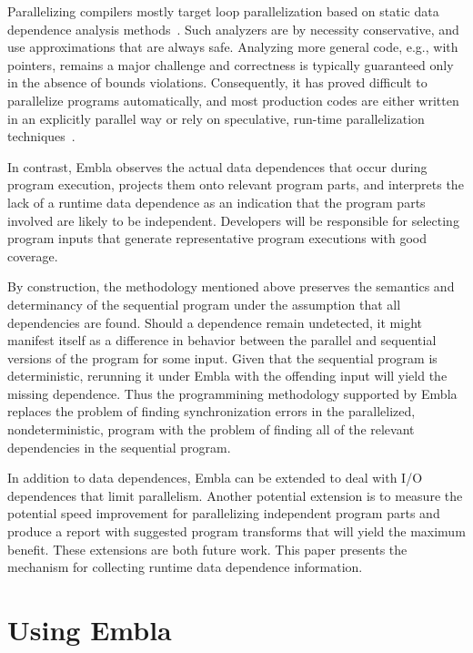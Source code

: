 \documentclass[times, 10pt,twocolumn]{article}
\begin{document}
Parallelizing compilers mostly target loop parallelization based on
static data dependence analysis methods~\cite{KA02}.  Such analyzers are
by necessity conservative, and use
approximations that are always safe.  
Analyzing more general code, e.g., with pointers, remains a major
challenge and correctness is typically guaranteed only in the absence of
bounds violations.  Consequently, it has proved difficult to
parallelize programs automatically, and most production codes are either
written in an explicitly parallel way or rely on speculative, run-time
parallelization techniques~\cite{PO03,CL03}.

In contrast, Embla
observes the actual data dependences that occur during program
execution, projects them onto relevant program parts, and interprets the
lack of a runtime data dependence as an indication that the program
parts involved are likely to be independent.
Developers will be responsible for selecting
program inputs that generate representative program executions with
good coverage.

By construction, the methodology mentioned above preserves the
semantics and determinancy of the sequential program under the
assumption that all dependencies are found.  Should a dependence
remain undetected, it might manifest itself as a difference in
behavior between the parallel and sequential versions of the program
for some input. Given that the sequential program is deterministic,
rerunning it under Embla with the offending input will yield the
missing dependence.  Thus the programmining methodology supported by
Embla replaces the problem of finding synchronization errors in the
parallelized, nondeterministic, program with the problem of finding
all of the relevant dependencies in the sequential program.


In addition to data dependences, Embla can be extended to
deal with I/O dependences that limit parallelism.  Another potential
extension is to measure the potential speed
improvement for parallelizing independent program parts and produce a
report with suggested program transforms that will yield the maximum
benefit.  These extensions are both future work.  This paper
presents the mechanism for collecting runtime data dependence information.



\section{Using Embla}
\end{document}
